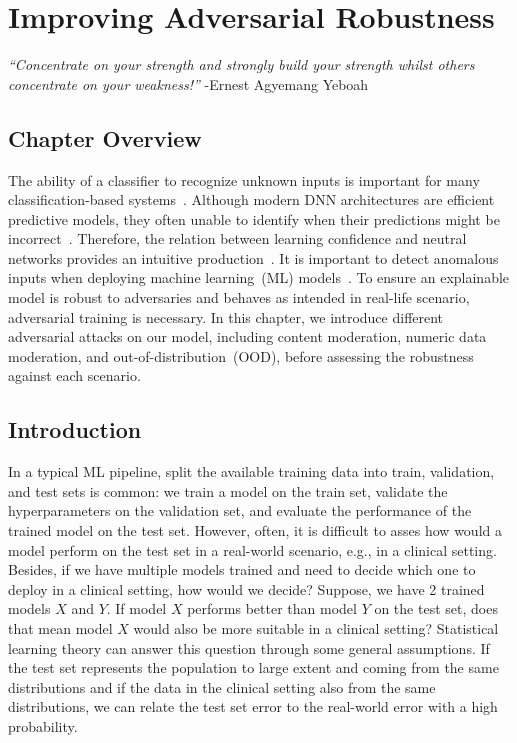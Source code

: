 \chapter{Improving Adversarial Robustness} \label{chapter:robustness}
\textit{``Concentrate on your strength and strongly build your strength whilst others concentrate on your weakness!''} -Ernest Agyemang Yeboah 

\section{Chapter Overview}
The ability of a classifier to recognize unknown inputs is important for many classification-based systems~\cite{OOD15}. Although modern DNN architectures are efficient predictive models, they often unable to identify when their predictions might be incorrect~\cite{OOD3}. Therefore, the relation between learning confidence and neutral networks provides an intuitive production~\cite{OOD3}.
It is important to detect anomalous inputs when deploying machine learning~(ML) models~\cite{OOD5}. To ensure an explainable model is robust to adversaries and behaves as intended in real-life scenario, adversarial training is necessary. In this chapter, we introduce different adversarial attacks on our model, including content moderation, numeric data moderation, and out-of-distribution~(OOD), before assessing the robustness against each scenario. 

\section{Introduction}
In a typical ML pipeline, split the available training data into train, validation, and test sets is common: we train a model on the train set, validate the hyperparameters on the validation set, and evaluate the performance of the trained model on the test set. However, often, it is difficult to asses how would a model perform on the test set in a real-world scenario, e.g., in a clinical setting. Besides, if we have multiple models trained and need to decide which one to deploy in a clinical setting, how would we decide? Suppose, we have 2 trained models $X$ and $Y$. If model $X$ performs better than model $Y$ on the test set, does that mean model $X$ would also be more suitable in a clinical setting? Statistical learning theory can answer this question through some general assumptions. If the test set represents the population to large extent and coming from the same distributions and if the data in the clinical setting also from the same distributions, we can relate the test set error to the real-world error with a high probability. 

